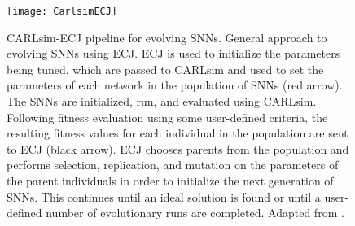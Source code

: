 \begin{figure}[h]
	\centering
	\texttt{[image: CarlsimECJ]}
    \caption{CARLsim-ECJ pipeline for evolving SNNs. General approach to evolving SNNs using ECJ. ECJ is used to initialize the parameters being tuned, which are passed to CARLsim and used to set the parameters of each network in the population of SNNs (red arrow). The SNNs are initialized, run, and evaluated using CARLsim. Following fitness evaluation using some user-defined criteria, the resulting fitness values for each individual in the population are sent to ECJ (black arrow). ECJ chooses parents from the population and performs selection, replication, and mutation on the parameters of the parent individuals in order to initialize the next generation of SNNs. This continues until an ideal solution is found or until a user-defined number of evolutionary runs are completed. Adapted from \citep{Carlson2014}.}
	\label{fig:CarlsimECJ}
\end{figure}



